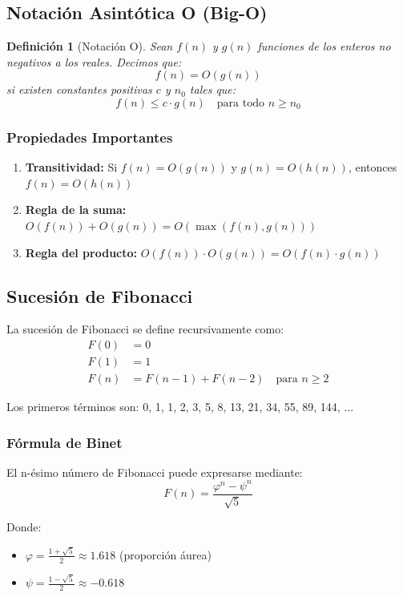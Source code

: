\documentclass[12pt,a4paper]{article}
\newtheorem{definicion}{Definición}
\begin{document}
\subsection{Notación Asintótica O (Big-O)}

\begin{definicion}[Notación O]
Sean $f(n)$ y $g(n)$ funciones de los enteros no negativos a los reales. Decimos que:
$$f(n) = O(g(n))$$
si existen constantes positivas $c$ y $n_0$ tales que:
$$f(n) \leq c \cdot g(n) \quad \text{para todo } n \geq n_0$$
\end{definicion}

\subsubsection{Propiedades Importantes}

\begin{enumerate}
    \item \textbf{Transitividad:} Si $f(n) = O(g(n))$ y $g(n) = O(h(n))$, entonces $f(n) = O(h(n))$
    \item \textbf{Regla de la suma:} $O(f(n)) + O(g(n)) = O(\max(f(n), g(n)))$
    \item \textbf{Regla del producto:} $O(f(n)) \cdot O(g(n)) = O(f(n) \cdot g(n))$
\end{enumerate}

\subsection{Sucesión de Fibonacci}

La sucesión de Fibonacci se define recursivamente como:
\begin{align}
    F(0) &= 0 \\
    F(1) &= 1 \\
    F(n) &= F(n-1) + F(n-2) \quad \text{para } n \geq 2
\end{align}

Los primeros términos son: 0, 1, 1, 2, 3, 5, 8, 13, 21, 34, 55, 89, 144, ...

\subsubsection{Fórmula de Binet}

El n-ésimo número de Fibonacci puede expresarse mediante:
$$F(n) = \frac{\varphi^n - \psi^n}{\sqrt{5}}$$

Donde:
\begin{itemize}
    \item $\varphi = \frac{1 + \sqrt{5}}{2} \approx 1.618$ (proporción áurea)
    \item $\psi = \frac{1 - \sqrt{5}}{2} \approx -0.618$
\end{itemize}
\end{document}
